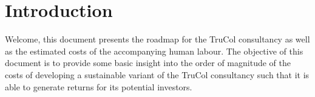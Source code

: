 \section{Introduction}\label{sec:intro}
Welcome, this document presents the roadmap for the TruCol consultancy as well as the estimated costs of the accompanying human labour. The objective of this document is to provide some basic insight into the order of magnitude of the costs of developing a sustainable variant of the TruCol consultancy such that it is able to generate returns for its potential investors. 